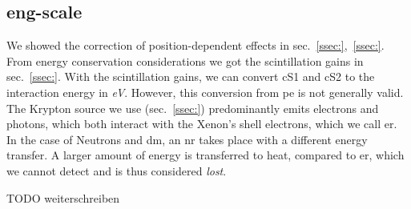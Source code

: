 
\FloatBarrier
\subsection{eng-scale}
\label{ssec:eng-scale}
\FloatBarrier


We showed the correction of position-dependent effects in sec.~\ref{ssec:},~\ref{ssec:}.  %
From energy conservation considerations we got the scintillation gains in sec.~\ref{ssec:}.  %
With the scintillation gains, we can convert cS1 and cS2 to the interaction energy in \textit{eV}.
However, this conversion from \gls{pe} is not generally valid.
The Krypton source we use (sec.~\ref{ssec:}) predominantly emits electrons and photons, which both interact with the Xenon's shell electrons, which we call \gls{er}. %
In the case of Neutrons and \gls{dm}, an \gls{nr} takes place with a different energy transfer.
A larger amount of energy is transferred to heat, compared to \gls{er}, which we cannot detect and is thus considered \emph{lost}.

TODO weiterschreiben





